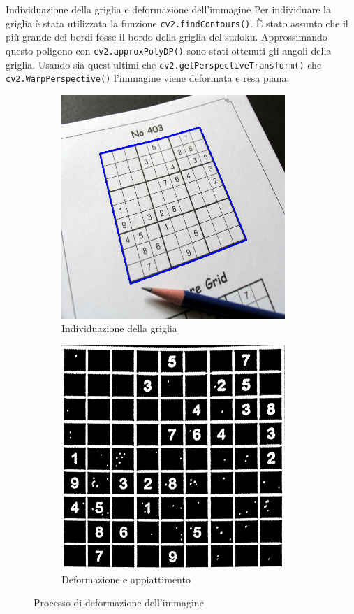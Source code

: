 \documentclass[10pt]{beamer}
\begin{document}
\begin{frame}[fragile]{Individuazione della griglia e deformazione dell'immagine}
    Per individuare la griglia è stata utilizzata la funzione
    \texttt{cv2.findContours()}. È stato assunto che il più grande dei
    bordi fosse il bordo della griglia del sudoku. Approssimando questo
    poligono con \texttt{cv2.approxPolyDP()} sono stati ottenuti gli
    angoli della griglia. Usando sia quest'ultimi che
    \texttt{cv2.getPerspectiveTransform()} che
    \texttt{cv2.WarpPerspective()} l'immagine viene deformata e resa
    piana.
%
    \begin{figure}
        \def\subwidth{0.50}
        \def\imgwidth{0.50}
        \centering
        \begin{subfigure}[b]{\subwidth\linewidth}
            \centering
            \includegraphics[width=\imgwidth\linewidth]{imgs/grid.png}
            \caption{Individuazione della griglia}\label{subfig:grid}
        \end{subfigure}%
        \begin{subfigure}[b]{\subwidth\linewidth}
            \centering
            \includegraphics[width=\imgwidth\linewidth]{imgs/warp.png}
            \caption{Deformazione e appiattimento}\label{subfig:warp}
        \end{subfigure}
        \caption{Processo di deformazione dell'immagine}\label{fig:warp_process}
    \end{figure}
\end{frame}
\end{document}
